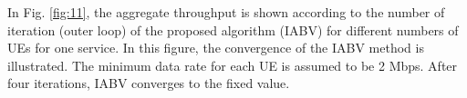 \documentclass[lettersize,journal]{IEEEtran}
\begin{document}

In Fig. \ref{fig:11}, the aggregate throughput is shown according to the number of iteration (outer loop) of the
proposed algorithm (IABV) for different numbers of UEs for one service. In this figure, the convergence of the IABV method is illustrated. The minimum data rate for each UE is assumed to be 2 Mbps.
After four iterations, IABV converges to the fixed value.
\end{document}
